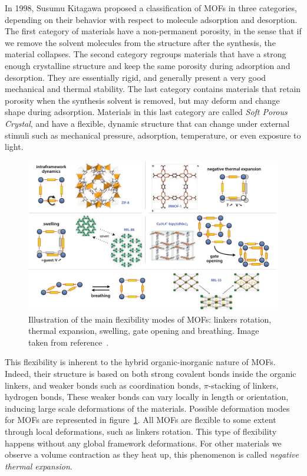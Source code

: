 \documentclass[thesis]{subfiles}
\begin{document}
In 1998, Susumu Kitagawa proposed a classification of MOFs in three
categories\cite{Horike2009}, depending on their behavior with respect to
molecule adsorption and desorption. The first category of materials have a
non-permanent porosity, in the sense that if we remove the solvent molecules
from the structure after the synthesis, the material collapses. The second
category regroups materials that have a strong enough crystalline structure and
keep the same porosity during adsorption and desorption. They are essentially
rigid, and generally present a very good mechanical and thermal stability. The
last category contains materials that retain porosity when the synthesis solvent
is removed, but may deform and change shape during adsorption. Materials in this
last category are called \emph{Soft Porous Crystal}, and have a flexible,
dynamic structure that can change under external stimuli such as mechanical
pressure, adsorption, temperature, or even exposure to light\cite{Kitagawa2005,
Coudert2015}.

\begin{figure}[ht]
    \centering
    \includegraphics[width=\textwidth]{figures/cited/mof-flexibility}
    \caption{Illustration of the main flexibility modes of MOFs: linkers
    rotation, thermal expansion, swelling, gate opening and breathing. Image
    taken from reference~\cite{Coudert2011}.}
    \label{fig:mof-flexibility}
\end{figure}

This flexibility is inherent to the hybrid organic-inorganic nature of MOFs.
Indeed, their structure is based on both strong covalent bonds inside the
organic linkers, and weaker bonds such as coordination bonds, $\pi$-stacking of
linkers, hydrogen bonds, \etc These weaker bonds can vary locally in length or
orientation, inducing large scale deformations of the materials. Possible
deformation modes for MOFs are represented in figure~\ref{fig:mof-flexibility}.
All MOFs are flexible to some extent through local deformations, such as linkers
rotation. This type of flexibility happens without any global framework
deformations. For other materials we observe a volume contraction as they heat
up, this phenomenon is called \emph{negative thermal
expansion}\cite{Dubbeldam2007}.
\end{document}
